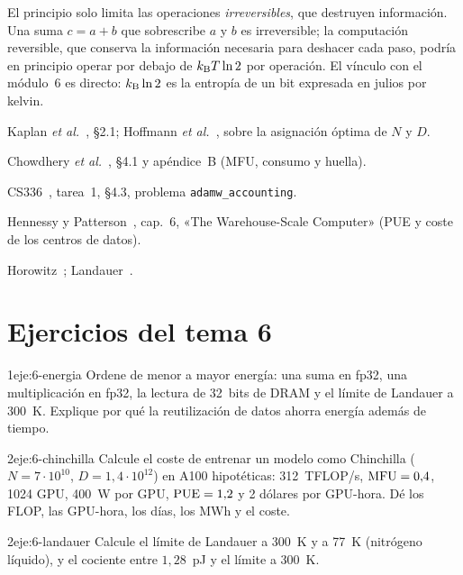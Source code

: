 \begin{observacion}
El principio solo limita las operaciones \emph{irreversibles}, que destruyen información. Una suma $c=a+b$ que sobrescribe $a$ y $b$ es irreversible; la computación reversible, que conserva la información necesaria para deshacer cada paso, podría en principio operar por debajo de $k_{\mathrm{B}} T\ln 2$ por operación. El vínculo con el módulo~6 es directo: $k_{\mathrm{B}}\ln 2$ es la entropía de un bit expresada en julios por kelvin.
\end{observacion}

\begin{lecturas}
\item Kaplan \emph{et al.}~\cite{kaplan}, §2.1; Hoffmann \emph{et al.}~\cite{chinchilla}, sobre la asignación óptima de $N$ y $D$.
\item Chowdhery \emph{et al.}~\cite{palm}, §4.1 y apéndice~B (MFU, consumo y huella).
\item CS336~\cite{cs336a1}, tarea~1, §4.3, problema \texttt{adamw\_accounting}.
\item Hennessy y Patterson~\cite{hp}, cap.~6, «The Warehouse-Scale Computer» (PUE y coste de los centros de datos).
\item Horowitz~\cite{horowitz}; Landauer~\cite{landauer}.
\end{lecturas}

\section*{Ejercicios del tema 6}

\begin{ejercicio}{1}{eje:6-energia}
Ordene de menor a mayor energía: una suma en fp32, una multiplicación en fp32, la lectura de 32~bits de DRAM y el límite de Landauer a 300~K. Explique por qué la reutilización de datos ahorra energía además de tiempo.
\end{ejercicio}

\begin{ejercicio}{2}{eje:6-chinchilla}
Calcule el coste de entrenar un modelo como Chinchilla ($N=7\cdot 10^{10}$, $D=1{,}4\cdot 10^{12}$) en A100 hipotéticas: 312~TFLOP/s, $\mathrm{MFU}=0{,}4$, 1024 GPU, 400~W por GPU, $\mathrm{PUE}=1{,}2$ y 2 dólares por GPU-hora. Dé los FLOP, las GPU-hora, los días, los MWh y el coste.
\end{ejercicio}

\begin{ejercicio}{2}{eje:6-landauer}
Calcule el límite de Landauer a 300~K y a 77~K (nitrógeno líquido), y el cociente entre $1{,}28$~pJ y el límite a 300~K.
\end{ejercicio}

